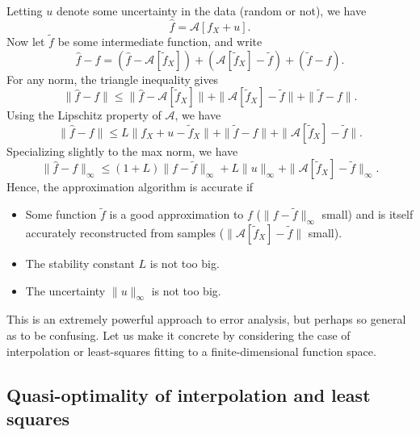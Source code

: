 \documentclass[12pt, leqno]{article} %
\begin{document}
Letting $u$ denote some uncertainty in the data (random or not), we have
\[
  \hat{f} = \mathcal{A}[f_X+u].
\]
Now let $\tilde{f}$ be some intermediate function, and write
\[
  \hat{f}-f =
    (\hat{f}-\mathcal{A}[\tilde{f}_X]) +
    (\mathcal{A}[\tilde{f}_X]-\tilde{f}) +
    (\tilde{f}-f).
\]
For any norm, the triangle inequality gives
\[
  \|\hat{f}-f\| \leq
    \|\hat{f}-\mathcal{A}[\tilde{f}_X]\| +
    \|\mathcal{A}[\tilde{f}_X]-\tilde{f}\| +
    \|\tilde{f}-f\|.
\]
Using the Lipschitz property of $\mathcal{A}$, we have
\[
  \|\hat{f}-f\| \leq
    L\|f_X+u-\tilde{f}_X\| +
    \|\tilde{f}-f\| +
    \|\mathcal{A}[\tilde{f}_X]-\tilde{f}\|.
\]
Specializing slightly to the max norm, we have
\[
  \|\hat{f}-f\|_\infty \leq
    (1+L)\|f-\tilde{f}\|_\infty + L\|u\|_\infty +
    \|\mathcal{A}[\tilde{f}_X]-\tilde{f}\|_\infty.
\]
Hence, the approximation algorithm is accurate if
\begin{itemize}
\item Some function $\tilde{f}$ is a good approximation to
  $f$ ($\|f-\tilde{f}\|_\infty$ small) and is itself accurately
  reconstructed from samples ($\|\mathcal{A}[\tilde{f}_X]-\tilde{f}\|$ small).
\item The stability constant $L$ is not too big.
\item The uncertainty $\|u\|_\infty$ is not too big.
\end{itemize}
This is an extremely powerful approach to error analysis, but
perhaps so general as to be confusing.  Let us make it concrete
by considering the case of interpolation or least-squares fitting
to a finite-dimensional function space.

\subsection{Quasi-optimality of interpolation and least squares}

\end{document}
